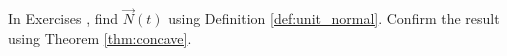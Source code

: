 {\noindent In Exercises}
{ , find $\vec N(t)$ using Definition \ref{def:unit_normal}. Confirm the result using Theorem \ref{thm:concave}.
}
